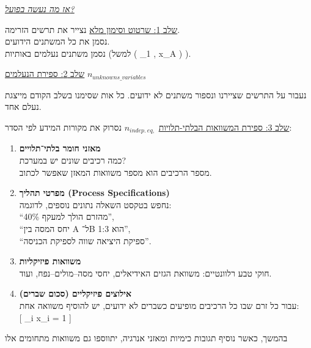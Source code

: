 \documentclass[
  hebrew,
  letterpaper,
  DIV=11,
  numbers=noendperiod]{scrreprt}
\begin{document}
\begin{tcolorbox}[enhanced jigsaw, colback=white, arc=.35mm, coltitle=black, breakable, toptitle=1mm, leftrule=.75mm, colbacktitle=quarto-callout-tip-color!10!white, opacitybacktitle=0.6, bottomtitle=1mm, titlerule=0mm, opacityback=0, colframe=quarto-callout-tip-color-frame, title=\textcolor{quarto-callout-tip-color}{\faLightbulb}\hspace{0.5em}{עצה}, rightrule=.15mm, bottomrule=.15mm, toprule=.15mm, left=2mm]

\ul{\emph{אז מה נעשה בפועל?}}

\ul{שלב 1: שרטוט וסימון מלא} נצייר את תרשים הזרימה.\\
נסמן את כל המשתנים הידועים.\\
נסמן משתנים נעלמים באותיות (למשל ( \_1 , x\_A ) ).

\ul{שלב 2: ספירת הנעלמים} \(n_{unknowns\_ variables}\)

נעבור על התרשים שציירנו ונספור משתנים לא ידועים. כל אות שסימנו בשלב
הקודם מייצגת נעלם אחד.

\ul{שלב 3: ספירת המשוואות הבלתי-תלויות} \(n_{indep.\ eq,}\) נסרוק את
מקורות המידע לפי הסדר:

\begin{enumerate}
\def\labelenumi{\arabic{enumi}.}
\item
  \textbf{מאזני חומר בלתי־תלויים}\\
  כמה רכיבים שונים יש במערכת?\\
  מספר הרכיבים הוא מספר משוואות המאזן שאפשר לכתוב.
\item
  \textbf{מפרטי תהליך (Process Specifications)}\\
  נחפש בטקסט השאלה נתונים נוספים, לדוגמה:\\
  ``40\% מהזרם הולך למעקף'',\\
  ``יחס המסה בין A ל־B הוא 1:3'',\\
  ``ספיקת היציאה שווה לספיקת הכניסה''.
\item
  \textbf{משוואות פיזיקליות}\\
  חוקי טבע רלוונטיים: משוואת הגזים האידיאלים, יחסי מסה--מולים--נפח,
  ועוד.
\item
  \textbf{אילוצים פיזיקליים (סכום שברים)}\\
  עבור כל זרם שבו כל הרכיבים מופיעים כשברים לא ידועים, יש להוסיף משוואה
  אחת:\\
  {[} \sum\_i x\_i = 1 {]}
\end{enumerate}

בהמשך, כאשר נוסיף תגובות כימיות ומאזני אנרגיה, יתווספו גם משוואות
מתחומים אלו


\end{tcolorbox}
\end{document}
